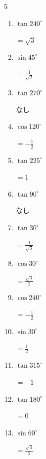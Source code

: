 \begin{multicols}{5}
\begin{enumerate}
  \item $\displaystyle \tan{240^\circ}$

        $\displaystyle =\sqrt{3}$

  \item $\displaystyle \sin{45^\circ}$

        $\displaystyle =\frac{1}{\sqrt{2}}$

  \item $\displaystyle \tan{270^\circ}$

        $\displaystyle なし$

\columnbreak %

  \item $\displaystyle \cos{120^\circ}$

        $\displaystyle =-\frac{1}{2}$

  \item $\displaystyle \tan{225^\circ}$

        $\displaystyle =1$

  \item $\displaystyle \tan{90^\circ}$

        $\displaystyle なし$

  \item $\displaystyle \tan{30^\circ}$

        $\displaystyle =\frac{1}{\sqrt{3}}$

  \item $\displaystyle \cos{30^\circ}$

        $\displaystyle =\frac{\sqrt{3}}{2}$

  \item $\displaystyle \cos{240^\circ}$

        $\displaystyle =-\frac{1}{2}$

  \item $\displaystyle \sin{30^\circ}$

        $\displaystyle =\frac{1}{2}$

  \item $\displaystyle \tan{315^\circ}$

        $\displaystyle =-1$

  \item $\displaystyle \tan{180^\circ}$

        $\displaystyle =0$

  \item $\displaystyle \sin{60^\circ}$

        $\displaystyle =\frac{\sqrt{3}}{2}$


\end{enumerate}
\end{multicols}
